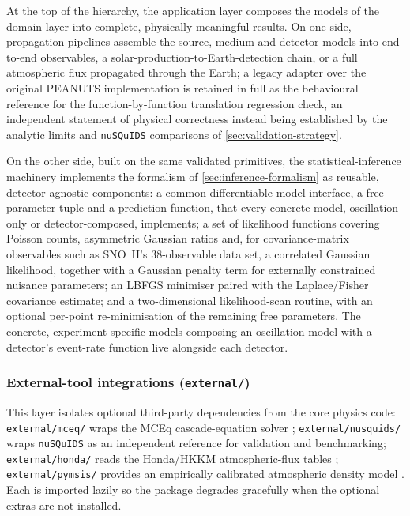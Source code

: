 At the top of the hierarchy, the application layer composes the models of the domain layer into complete, physically meaningful results. On one side, propagation pipelines assemble the source, medium and detector models into end-to-end observables, a solar-production-to-Earth-detection chain, or a full atmospheric flux propagated through the Earth; a legacy adapter over the original PEANUTS implementation is retained in full as the behavioural reference for the function-by-function translation regression check, an independent statement of physical correctness instead being established by the analytic limits and \texttt{nuSQuIDS} comparisons of \cref{sec:validation-strategy}.

\label{sec:inference-layer}
On the other side, built on the same validated primitives, the statistical-inference machinery implements the formalism of \cref{sec:inference-formalism} as reusable, detector-agnostic components: a common differentiable-model interface, a free-parameter tuple and a prediction function, that every concrete model, oscillation-only or detector-composed, implements; a set of likelihood functions covering Poisson counts, asymmetric Gaussian ratios and, for covariance-matrix observables such as SNO~II's 38-observable data set, a correlated Gaussian likelihood, together with a Gaussian penalty term for externally constrained nuisance parameters; an LBFGS minimiser paired with the Laplace/Fisher covariance estimate; and a two-dimensional likelihood-scan routine, with an optional per-point re-minimisation of the remaining free parameters. The concrete, experiment-specific models composing an oscillation model with a detector's event-rate function live alongside each detector.

\subsubsection{External-tool integrations (\texttt{external/})}

This layer isolates optional third-party dependencies from the core physics code: \texttt{external/mceq/} wraps the MCEq cascade-equation solver \parencite{Fedynitch2015}; \texttt{external/nusquids/} wraps \texttt{nuSQuIDS} \parencite{nuSQuIDS} as an independent reference for validation and benchmarking; \texttt{external/honda/} reads the Honda/HKKM atmospheric-flux tables \parencite{Honda2007}; \texttt{external/pymsis/} provides an empirically calibrated atmospheric density model \parencite{Emmert2021}. Each is imported lazily so the package degrades gracefully when the optional extras are not installed.

